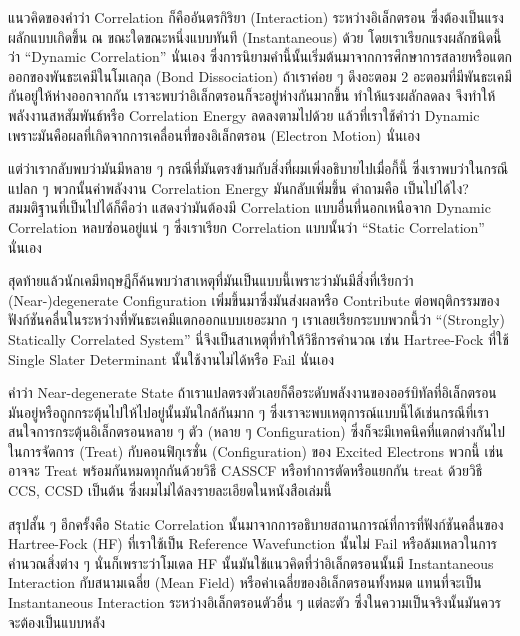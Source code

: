 แนวคิดของคำว่า Correlation ก็คืออันตรกิริยา (Interaction) ระหว่างอิเล็กตรอน ซึ่งต้องเป็นแรงผลักแบบเกิดขึ้น ณ ขณะใดขณะหนึ่งแบบทันที (Instantaneous) ด้วย โดยเราเรียกแรงผลักชนิดนี้ว่า \enquote{Dynamic Correlation} นั่นเอง ซึ่งการนิยามคำนี้นั้นเริ่มต้นมาจากการศึกษาการสลายหรือแตกออกของพันธะเคมีในโมเลกุล (Bond Dissociation) ถ้าเราค่อย ๆ ดึงอะตอม 2 อะตอมที่มีพันธะเคมีกันอยู่ให้ห่างออกจากกัน เราจะพบว่าอิเล็กตรอนก็จะอยู่ห่างกันมากขึ้น ทำให้แรงผลักลดลง จึงทำให้พลังงานสหสัมพันธ์หรือ Correlation Energy ลดลงตามไปด้วย แล้วที่เราใช้คำว่า Dynamic เพราะมันคือผลที่เกิดจากการเคลื่อนที่ของอิเล็กตรอน (Electron Motion) นั่นเอง

แต่ว่าเรากลับพบว่ามันมีหลาย ๆ กรณีที่มันตรงข้ามกับสิ่งที่ผมเพิ่งอธิบายไปเมื่อกี้นี้ ซึ่งเราพบว่าในกรณีแปลก ๆ พวกนั้นค่าพลังงาน Correlation Energy มันกลับเพิ่มขึ้น คำถามคือ เป็นไปได้ไง? สมมติฐานที่เป็นไปได้ก็คือว่า แสดงว่ามันต้องมี Correlation แบบอื่นที่นอกเหนือจาก Dynamic Correlation หลบซ่อนอยู่แน่ ๆ ซึ่งเราเรียก Correlation แบบนั้นว่า \enquote{Static Correlation} นั่นเอง

สุดท้ายแล้วนักเคมีทฤษฎีก็ค้นพบว่าสาเหตุที่มันเป็นแบบนี้เพราะว่ามันมีสิ่งที่เรียกว่า (Near-)degenerate Configuration เพิ่มขึ้นมาซึ่งมันส่งผลหรือ Contribute ต่อพฤติกรรมของฟังก์ชันคลื่นในระหว่างที่พันธะเคมีแตกออกแบบเยอะมาก ๆ เราเลยเรียกระบบพวกนี้ว่า \enquote{(Strongly) Statically Correlated System} นี่จึงเป็นสาเหตุที่ทำให้วิธีการคำนวณ เช่น Hartree-Fock ที่ใช้ Single Slater Determinant นั้นใช้งานไม่ได้หรือ Fail นั่นเอง

คำว่า Near-degenerate State ถ้าเราแปลตรงตัวเลยก็คือระดับพลังงานของออร์บิทัลที่อิเล็กตรอนมันอยู่หรือถูกกระตุ้นไปให้ไปอยู่นั้นมันใกล้กันมาก ๆ ซึ่งเราจะพบเหตุการณ์แบบนี้ได้เช่นกรณีที่เราสนใจการกระตุ้นอิเล็กตรอนหลาย ๆ ตัว (หลาย ๆ Configuration) ซึ่งก็จะมีเทคนิคที่แตกต่างกันไปในการจัดการ (Treat) กับคอนฟิกุเรชั่น (Configuration) ของ Excited Electrons พวกนี้ เช่นอาจจะ Treat พร้อมกันหมดทุกกันด้วยวิธี CASSCF หรือทำการตัดหรือแยกกัน treat ด้วยวิธี CCS, CCSD เป็นต้น ซึ่งผมไม่ได้ลงรายละเอียดในหนังสือเล่มนี้

สรุปสั้น ๆ อีกครั้งคือ Static Correlation นั้นมาจากการอธิบายสถานการณ์ที่การที่ฟังก์ชันคลื่นของ Hartree-Fock (HF) ที่เราใช้เป็น Reference Wavefunction นั้นไม่ Fail หรือล้มเหลวในการคำนวณสิ่งต่าง ๆ นั่นก็เพราะว่าโมเดล HF นั้นมันใช้แนวคิดที่ว่าอิเล็กตรอนนั้นมี Instantaneous Interaction กับสนามเฉลี่ย (Mean Field) หรือค่าเฉลี่ยของอิเล็กตรอนทั้งหมด แทนที่จะเป็น Instantaneous Interaction ระหว่างอิเล็กตรอนตัวอื่น ๆ แต่ละตัว ซึ่งในความเป็นจริงนั้นมันควรจะต้องเป็นแบบหลัง

